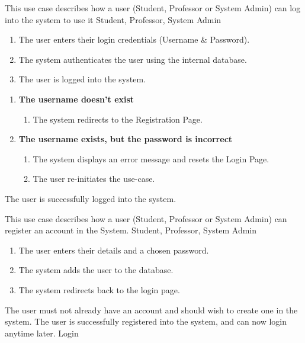 \documentclass[12pt, a4]{report}
\begin{document}
{ %
This use case describes how a user (Student, Professor or System Admin) can log into the system to use it
}
{ %
Student, Professor, System Admin
}
{ %
\begin{enumerate}
    \item The user enters their login credentials (Username \& Password).
    \item The system authenticates the user using the internal database.
    \item The user is logged into the system.
\end{enumerate}
}
{ %
\begin{enumerate}
    \item \textbf{The username doesn't exist}
            \begin{enumerate}
                \item The system redirects to the Registration Page.
            \end{enumerate}
    \item \textbf{The username exists, but the password is incorrect}
            \begin{enumerate}
                \item The system displays an error message and resets the Login Page.
                \item The user re-initiates the use-case.
            \end{enumerate}
\end{enumerate}
}
{ %
}
{ %
The user is successfully logged into the system.
}
{ %
}
{ %
}


{ %
This use case describes how a user (Student, Professor or System Admin) can register an account in the System.
}
{ %
Student, Professor, System Admin
}
{ %
\begin{enumerate}
    \item The user enters their details and a chosen password.
    \item The system adds the user to the database.
    \item The system redirects back to the login page.
\end{enumerate}
}
{ %
}
{ %
The user must not already have an account and should wish to create one in the system.
}
{ %
The user is successfully registered into the system, and can now login anytime later.
}
{ %
}
{ %
Login
}
\end{document}
